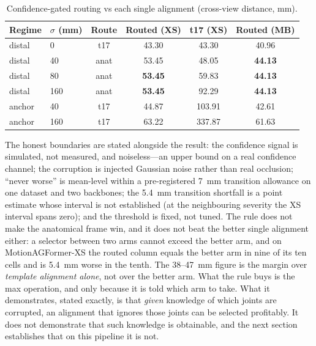 \documentclass[12pt,a4paper]{report}
\begin{document}
\begin{table}[H]
\centering
\caption[Confidence-gated routing against each single alignment]{Confidence-gated routing vs each single alignment (cross-view distance, mm).}
\label{tab:routing}
\begin{tabular}{llcccc}
\toprule
Regime & $\sigma$ (mm) & Route & Routed (XS) & t17 (XS) & Routed (MB) \\
\midrule
distal & 0 & t17 & 43.30 & 43.30 & 40.96 \\
distal & 40 & anat & 53.45 & 48.05 & \textbf{44.13} \\
distal & 80 & anat & \textbf{53.45} & 59.83 & \textbf{44.13} \\
distal & 160 & anat & \textbf{53.45} & 92.29 & \textbf{44.13} \\
anchor & 40 & t17 & 44.87 & 103.91 & 42.61 \\
anchor & 160 & t17 & 63.22 & 337.87 & 61.63 \\
\bottomrule
\end{tabular}
\end{table}

The honest boundaries are stated alongside the result: the confidence signal is simulated, not measured, and noiseless---an upper bound on a real confidence channel; the corruption is injected Gaussian noise rather than real occlusion; ``never worse'' is mean-level within a pre-registered 7~mm transition allowance on one dataset and two backbones; the 5.4~mm transition shortfall is a point estimate whose interval is not established (at the neighbouring severity the XS interval spans zero); and the threshold is fixed, not tuned. The rule does not make the anatomical frame win, and it does not beat the better single alignment either: a selector between two arms cannot exceed the better arm, and on MotionAGFormer-XS the routed column equals the better arm in nine of its ten cells and is 5.4~mm worse in the tenth. The 38--47~mm figure is the margin over \emph{template alignment alone}, not over the better arm. What the rule buys is the max operation, and only because it is told which arm to take. What it demonstrates, stated exactly, is that \emph{given} knowledge of which joints are corrupted, an alignment that ignores those joints can be selected profitably. It does not demonstrate that such knowledge is obtainable, and the next section establishes that on this pipeline it is not.
\end{document}
